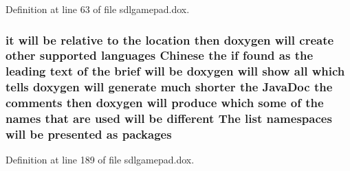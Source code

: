 Definition at line 63 of file sdlgamepad.\-dox.

\hypertarget{sdlgamepad_8dox_a299b82abc5d35aed83d60f05c2cb228c}{
\subsubsection[{packages}]{\setlength{\rightskip}{0pt plus 5cm}it will be relative to the {\bf location} then doxygen will create other supported languages {\bf Chinese} the {\bf if} found as the leading text of the brief will be doxygen will show all which tells doxygen will generate much shorter the Java\-Doc the comments then doxygen will produce which some of the names that {\bf are} used will be different The list namespaces will be presented as packages}}\label{sdlgamepad_8dox_a299b82abc5d35aed83d60f05c2cb228c}


Definition at line 189 of file sdlgamepad.\-dox.

